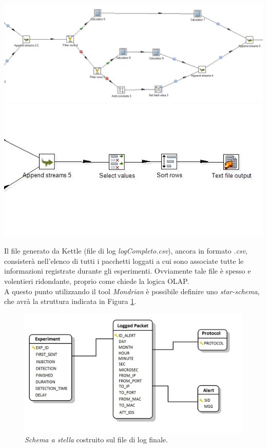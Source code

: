 	\includegraphics[scale=0.4]{figure/kettle3.jpg}\\
	
	\includegraphics[scale=0.4]{figure/kettle4.jpg}
	
	Il file generato da Kettle (file di log \textit{logCompleto.csv}), ancora in formato \textit{.csv}, consisterà nell'elenco di tutti i pacchetti loggati a cui sono associate tutte le informazioni registrate durante gli esperimenti. Ovviamente tale file è spesso e volentieri ridondante, proprio come chiede la logica OLAP.\\
	A questo punto utilizzando il tool \textit{Mondrian} è possibile definire uno \textit{star-schema}, che avrà la struttura indicata in Figura \ref{fig:star}.
	
	\begin{figure}[h!]
		\centering
		\includegraphics[scale=0.45]{figure/star-schema.jpg}
		\caption{\textit{Schema a stella} costruito sul file di log finale.}
		\label{fig:star}
	\end{figure}
	
